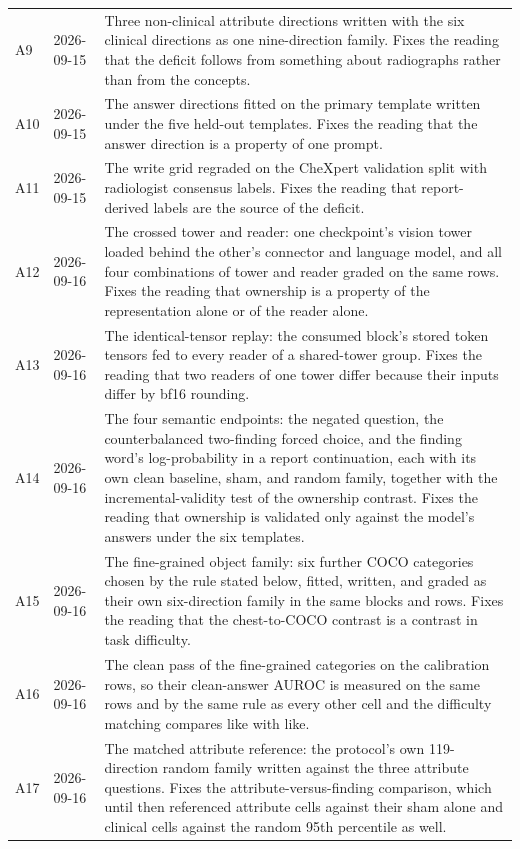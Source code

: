 \begin{table}[h]
\begin{tabular}{ll>{\raggedright\arraybackslash}p{}}
A9 & 2026-09-15 & Three non-clinical attribute directions written with the six clinical directions as one nine-direction family. Fixes the reading that the deficit follows from something about radiographs rather than from the concepts. \\
A10 & 2026-09-15 & The answer directions fitted on the primary template written under the five held-out templates. Fixes the reading that the answer direction is a property of one prompt. \\
A11 & 2026-09-15 & The write grid regraded on the CheXpert validation split with radiologist consensus labels. Fixes the reading that report-derived labels are the source of the deficit. \\
A12 & 2026-09-16 & The crossed tower and reader: one checkpoint's vision tower loaded behind the other's connector and language model, and all four combinations of tower and reader graded on the same rows. Fixes the reading that ownership is a property of the representation alone or of the reader alone. \\
A13 & 2026-09-16 & The identical-tensor replay: the consumed block's stored token tensors fed to every reader of a shared-tower group. Fixes the reading that two readers of one tower differ because their inputs differ by bf16 rounding. \\
A14 & 2026-09-16 & The four semantic endpoints: the negated question, the counterbalanced two-finding forced choice, and the finding word's log-probability in a report continuation, each with its own clean baseline, sham, and random family, together with the incremental-validity test of the ownership contrast. Fixes the reading that ownership is validated only against the model's answers under the six templates. \\
A15 & 2026-09-16 & The fine-grained object family: six further COCO categories chosen by the rule stated below, fitted, written, and graded as their own six-direction family in the same blocks and rows. Fixes the reading that the chest-to-COCO contrast is a contrast in task difficulty. \\
A16 & 2026-09-16 & The clean pass of the fine-grained categories on the calibration rows, so their clean-answer AUROC is measured on the same rows and by the same rule as every other cell and the difficulty matching compares like with like. \\
A17 & 2026-09-16 & The matched attribute reference: the protocol's own 119-direction random family written against the three attribute questions. Fixes the attribute-versus-finding comparison, which until then referenced attribute cells against their sham alone and clinical cells against the random 95th percentile as well. \\

\end{tabular}
\end{table}
